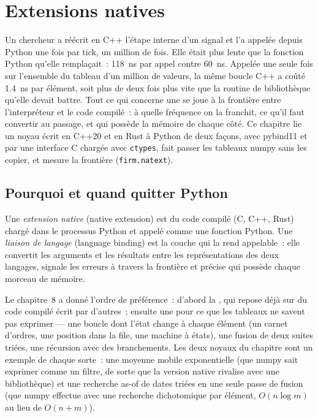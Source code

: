 \chapter{Extensions natives}\label{ch:pl:native-extensions}

Un chercheur a réécrit en C++ l'étape interne d'un signal et l'a appelée depuis Python une fois par tick, un million de fois. Elle était plus lente
que la fonction Python qu'elle remplaçait~: 118~ns par appel contre 60~ns. Appelée une seule fois sur l'ensemble du tableau d'un million de valeurs, la
même boucle C++ a coûté 1.4~ns par élément, soit plus de deux fois plus vite que la routine de bibliothèque qu'elle devait battre. Tout
ce qui concerne une  se joue à la frontière entre l'interpréteur et le code compilé~: à quelle fréquence on la franchit, ce qu'il faut
convertir au passage, et qui possède la mémoire de chaque côté. Ce chapitre lie un noyau écrit en C++20 et en Rust à Python
de deux façons, avec pybind11 et par une interface C chargée avec \texttt{ctypes}, fait passer les tableaux numpy sans les copier,
et mesure la frontière (\texttt{firm.natext}).

\section{Pourquoi et quand quitter Python}

\begin{definition}\label{def:pl:native-extensions:extension}
Une \emph{extension native} (native extension) est du code compilé (C, C++, Rust) chargé dans le processus Python et appelé comme une
fonction Python. Une \emph{liaison de langage} (language binding) est la couche qui la rend appelable~: elle convertit les arguments et
les résultats entre les représentations des deux langages, signale les erreurs à travers la frontière et précise qui possède chaque morceau de mémoire.
\end{definition}

Le chapitre~8 a donné l'ordre de préférence~: d'abord la , qui repose déjà sur du code compilé écrit par d'autres~; ensuite une
 pour ce que les tableaux ne savent pas exprimer --- une boucle dont l'état change à chaque élément (un carnet d'ordres, une position dans la file, une machine à
états), une fusion de deux suites triées, une récursion avec des branchements. Les deux noyaux du chapitre sont un exemple de chaque sorte~: une moyenne mobile exponentielle
(que numpy sait exprimer comme un filtre, de sorte que la version native rivalise avec une bibliothèque) et une recherche as-of de dates triées
en une seule passe de fusion (que numpy effectue avec une recherche dichotomique par élément, $O(n \log m)$ au lieu de $O(n + m)$).

